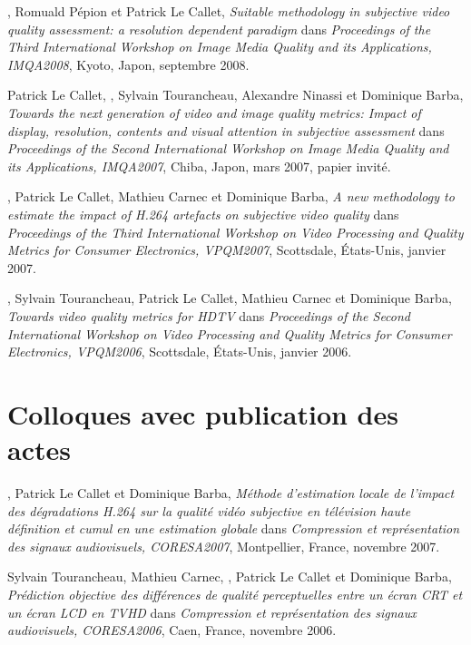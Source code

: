 \bigskip

\noindent {}, Romuald Pépion et Patrick Le Callet, \emph{Suitable methodology in subjective video quality assessment: a resolution dependent paradigm} dans \emph{Proceedings of the Third International Workshop on Image Media Quality and its Applications, IMQA2008}, Kyoto, Japon, septembre 2008.

\bigskip

\noindent Patrick Le Callet, , Sylvain Tourancheau, Alexandre Ninassi et Dominique Barba, \emph{Towards the next generation of video and image quality metrics: Impact of display, resolution, contents and visual attention in subjective assessment} dans \emph{Proceedings of the Second International Workshop on Image Media Quality and its Applications, IMQA2007}, Chiba, Japon, mars 2007, papier invité.

\bigskip

\noindent {}, Patrick Le Callet, Mathieu Carnec et Dominique Barba, \emph{A new methodology to estimate the impact of H.264 artefacts on subjective video quality} dans \emph{Proceedings of the Third International Workshop on Video Processing and Quality Metrics for Consumer Electronics, VPQM2007}, Scottsdale, États-Unis, janvier 2007.

\bigskip

\noindent {}, Sylvain Tourancheau, Patrick Le Callet, Mathieu Carnec et Dominique Barba, \emph{Towards video quality metrics for HDTV} dans \emph{Proceedings of the Second International Workshop on Video Processing and Quality Metrics for Consumer Electronics, VPQM2006}, Scottsdale, États-Unis, janvier 2006.



\section*{Colloques avec publication des actes}
\noindent {}, Patrick Le Callet et Dominique Barba, \emph{Méthode d'estimation locale de l'impact des dégradations H.264 sur la qualité vidéo subjective en télévision haute définition et cumul en une estimation globale} dans \emph{Compression et représentation des signaux audiovisuels, CORESA2007}, Montpellier, France, novembre 2007.

\bigskip

\noindent Sylvain Tourancheau, Mathieu Carnec, , Patrick Le Callet et Dominique Barba, \emph{Prédiction objective des différences de qualité perceptuelles entre un écran CRT et un écran LCD en TVHD} dans \emph{Compression et représentation des signaux audiovisuels, CORESA2006}, Caen, France, novembre 2006.


